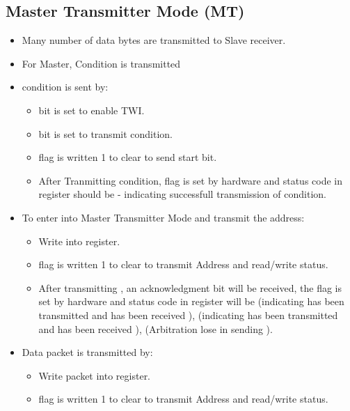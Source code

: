 \documentclass{article}
\begin{document}
\subsection{Master Transmitter Mode (MT)}
\begin{itemize}
    \item Many number of data bytes are transmitted to Slave receiver.
    \item For Master,  Condition is transmitted
    \item {} condition is sent by:
    \begin{itemize}
        \item {} bit is set to enable TWI.
        \item {} bit is set to transmit  condition.
        \item {} flag is written 1 to clear to send start bit.
        \item After Tranmitting  condition,  flag is set by hardware and status code in  register should be  - indicating successfull transmission of  condition.
    \end{itemize}
    \item  To enter into Master Transmitter Mode and transmit the address:
    \begin{itemize}
        \item Write  into  register.
        \item {} flag is written 1 to clear to transmit Address and read/write status.
        \item After transmitting , an acknowledgment bit will be received, the  flag is set by hardware and status code in  register will be  (indicating  has been transmitted and  has been received ),  (indicating  has been transmitted and  has been received ),  (Arbitration lose in sending ).
    \end{itemize}
    \item Data packet is transmitted by:
    \begin{itemize}
        \item Write  packet into  register.
        \item {} flag is written 1 to clear to transmit Address and read/write status.

\end{itemize}
\end{itemize}
\end{document}
